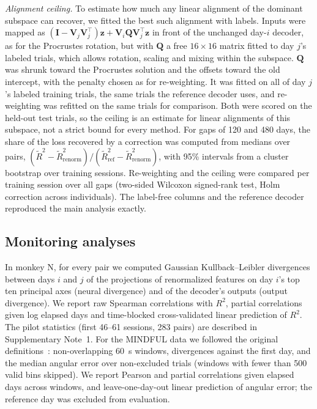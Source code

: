 \documentclass{iopjournal}
\begin{document}
\textit{Alignment ceiling.} To estimate how much any linear alignment of the dominant subspace can recover, we fitted
the best such alignment with labels. Inputs were mapped
as $(\mathbf{I} - \mathbf{V}_j\mathbf{V}_j^\top)\mathbf{z} + \mathbf{V}_i\mathbf{Q}\mathbf{V}_j^\top\mathbf{z}$ in front of
the unchanged day-$i$ decoder, as for the Procrustes rotation, but with $\mathbf{Q}$ a free $16 \times 16$ matrix fitted
to day $j$'s labeled trials, which allows rotation, scaling and mixing within the subspace. $\mathbf{Q}$ was shrunk toward
the Procrustes solution and the offsets toward the old intercept, with the penalty chosen as for re-weighting. It was
fitted on all of day $j$'s labeled training trials, the same trials the reference decoder uses, and re-weighting was
refitted on the same trials for comparison. Both were scored on the held-out test trials, so the ceiling is an estimate
for linear alignments of this subspace, not a strict bound for every method. For gaps of 120 and 480 days, the share of the loss recovered by a
correction was computed from medians over pairs, $(\tilde{R}^2 - \tilde{R}^2_{\text{renorm}})/(\tilde{R}^2_{\text{ref}}
- \tilde{R}^2_{\text{renorm}})$, with 95\% intervals from a cluster bootstrap over training sessions. Re-weighting and
the ceiling were compared per training session over all gaps (two-sided Wilcoxon signed-rank test, Holm correction
across individuals). The label-free columns and the reference decoder reproduced the main analysis exactly.

\subsection{Monitoring analyses}

In monkey N, for every pair we computed Gaussian Kullback--Leibler divergences between days $i$ and $j$ of the
projections of renormalized features on day $i$'s top ten principal axes (neural divergence) and of the decoder's
outputs (output divergence). We report raw Spearman correlations with $R^2$, partial correlations given log elapsed days
and time-blocked cross-validated linear prediction of $R^2$. The pilot statistics (first 46--61 sessions, 283 pairs) are
described in Supplementary Note~1. For the MINDFUL data we followed the original definitions~\cite{pun2024}:
non-overlapping 60~s windows, divergences against the first day, and the median angular error over non-excluded trials
(windows with fewer than 500 valid bins skipped). We report Pearson and partial correlations given elapsed days across
windows, and leave-one-day-out linear prediction of angular error; the reference day was excluded from evaluation.
\end{document}
